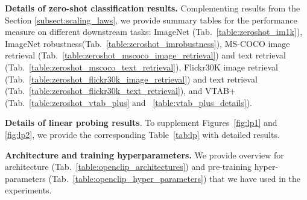 \begin{appendix}
\textbf{Details of zero-shot classification results.} Complementing results from the Section \ref{subsect:scaling_laws}, we provide summary tables for the performance measure on different downstream tasks:  ImageNet (Tab.~\ref{table:zeroshot_im1k}), ImageNet robustness(Tab.~\ref{table:zeroshot_imrobustness}), MS-COCO image retrieval (Tab.~\ref{table:zeroshot_mscoco_image_retrieval}) and text retrieval (Tab.~\ref{table:zeroshot_mscoco_text_retrieval}), Flickr30K image retrieval (Tab.~\ref{table:zeroshot_flickr30k_image_retrieval}) and text retrieval (Tab.~\ref{table:zeroshot_flickr30k_text_retrieval}), and VTAB+ (Tab.~\ref{table:zeroshot_vtab_plus} and ~\ref{table:vtab_plus_details}).

\textbf{Details of linear probing results}. To supplement Figures~\ref{fig:lp1} and \ref{fig:lp2}, we provide the corresponding Table~\ref{tab:lp} with detailed results.





\textbf{Architecture and training hyperparameters.} We provide overview for architecture (Tab.~\ref{table:openclip_architectures}) and pre-training hyper-parameters (Tab.~\ref{table:openclip_hyper_parameters}) that we have used in the experiments. 


\end{appendix}
